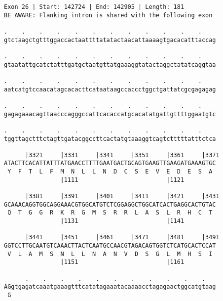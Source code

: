\documentclass{article}
\begin{document}
\begin{Verbatim}
Exon 26 | Start: 142724 | End: 142905 | Length: 181
BE AWARE: Flanking intron is shared with the following exon
 
.    .    .    .    .    .    .    .    .    .    .    .    
gtctaagctgtttggaccactaattttatatactaacattaaaagtgacacatttaccag
  
.    .    .    .    .    .    .    .    .    .    .    .    
gtaatattgcatctatttgatgctaatgttatgaaaggtatactaggctatatcaggtaa
  
.    .    .    .    .    .    .    .    .    .    .    .    
aatcatgtccaacatagcacacttcataataagccaccctggctgattatcgcgagagag
  
.    .    .    .    .    .    .    .    .    .    .    .    
gagagaaacagttaacccagggccattcacaccatgcacatatgattgttttggaatgtc
  
.    .    .    .    .    .    .    .    .    .    .    .    
tggttagctttctagttgatacggccttcactatgtaaaggtcagtctttttatttctca
  
      |3321     |3331     |3341     |3351     |3361     |3371
ATACTTCACATTATTTATGAACCTTTTGAATGACTGCAGTGAAGTTGAAGATGAAAGTGC
 Y  F  T  L  F  M  N  L  L  N  D  C  S  E  V  E  D  E  S  A 
                |1111                         |1121         
  
      |3381     |3391     |3401     |3411     |3421     |3431
GCAAACAGGTGGCAGGAAACGTGGCATGTCTCGGAGGCTGGCATCACTGAGGCACTGTAC
 Q  T  G  G  R  K  R  G  M  S  R  R  L  A  S  L  R  H  C  T 
                |1131                         |1141         
  
      |3441     |3451     |3461     |3471     |3481     |3491
GGTCCTTGCAATGTCAAACTTACTCAATGCCAACGTAGACAGTGGTCTCATGCACTCCAT
 V  L  A  M  S  N  L  L  N  A  N  V  D  S  G  L  M  H  S  I 
                |1151                         |1161         
  
      .    .    .    .    .    .    .    .    .    .    .   
AGgtgagatcaaatgaaagtttcatatagaaatacaaaacctagagaactggcatgtaag
 G                                                          
\end{Verbatim}
\newpage
\end{document}
